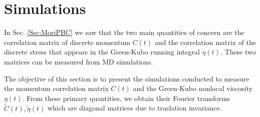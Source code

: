 \documentclass[b5paper,openright,10pt]{book}
\begin{document}
\section{Simulations}
\label{Sec:SimPBC}
In Sec. \ref{Sec:MoriPBC} we saw that the  two main  quantities of  concern  are the  correlation matrix  of
discrete momentum  $C(t)$ and the  correlation matrix of  the discrete
stress  that appears  in  the Green-Kubo  running integral  $\eta(t)$.
These two  matrices can be measured  from MD simulations.

The objective of this section is to present the simulations conducted to measure the
momentum  correlation  matrix  $C(t)$  and  the  Green-Kubo  nonlocal
viscosity $\eta(t)$.   From these primary quantities,  we obtain their
Fourier transforms  $\tilde{C}(t),\tilde{\eta}(t)$ which  are diagonal
matrices  due to  traslation invariance.  
\end{document}
